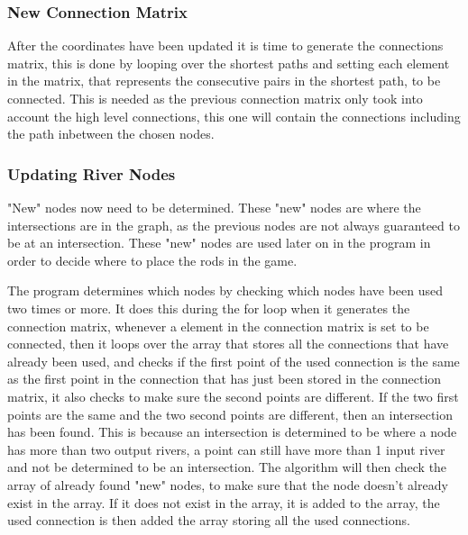 \subsubsection{New Connection Matrix}
	After the coordinates have been updated it is time to generate the connections matrix, this is done by looping over the shortest paths and setting each element in the matrix, that represents the consecutive pairs in the shortest path, to be connected. This is needed as the previous connection matrix only took into account the high level connections, this one will contain the connections including the path inbetween the chosen nodes.

\subsubsection{Updating River Nodes}

	"New" nodes now need to be determined. These "new" nodes are where the intersections are in the graph, as the previous nodes are not always guaranteed to be at an intersection. These "new" nodes are used later on in the program in order to decide where to place the rods in the game.
	\newline
	\par
	The program determines which nodes by checking which nodes have been used two times or more. It does this during the for loop when it generates the connection matrix, whenever a element in the connection matrix is set to be connected, then it loops over the array that stores all the connections that have already been used, and checks if the first point of the used connection is the same as the first point in the connection that has just been stored in the connection matrix, it also checks to make sure the second points are different. If the two first points are the same and the two second points are different, then an intersection has been found. This is because an intersection is determined to be where a node has more than two output rivers, a point can still have more than 1 input river and not be determined to be an intersection. The algorithm will then check the array of already found "new" nodes, to make sure that the node doesn't already exist in the array. If it does not exist in the array, it is added to the array, the used connection is then added the array storing all the used connections.
	\newline
	\par
	
